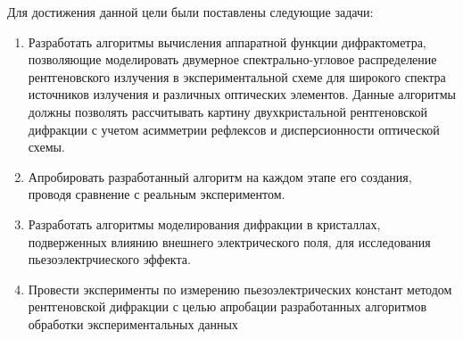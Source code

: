 Для достижения данной цели были поставлены следующие задачи:
\begin{enumerate}
\item Разработать алгоритмы вычисления аппаратной функции дифрактометра, позволяющие моделировать
двумерное спектрально-угловое распределение рентгеновского излучения в экспериментальной схеме
для широкого спектра источников излучения и различных оптических элементов.
Данные алгоритмы должны позволять рассчитывать картину двухкристальной рентгеновской дифракции с учетом
асимметрии рефлексов и дисперсионности оптической схемы.

\item Апробировать разработанный алгоритм на каждом этапе его создания,
проводя сравнение с реальным экспериментом.

\item  Разработать алгоритмы моделирования дифракции в кристаллах, подверженных
влиянию внешнего электрического поля, для исследования пьезоэлектрчиеского эффекта.

\item Провести эксперименты по измерению пьезоэлектрических констант
методом рентгеновской дифракции с целью апробации разработанных алгоритмов
обработки экспериментальных данных
\end{enumerate}

%
